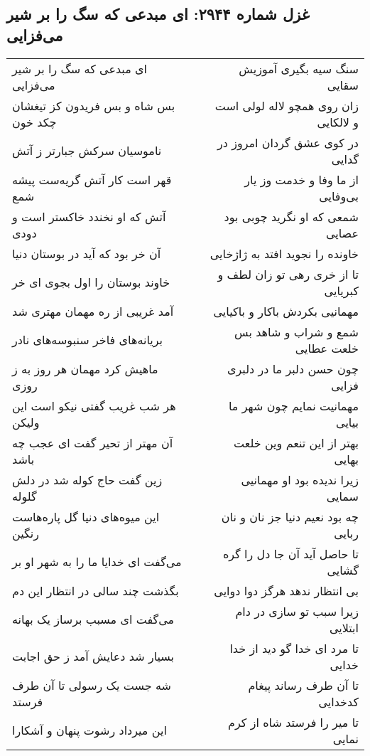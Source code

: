\begin{center}
\section*{غزل شماره ۲۹۴۴: ای مبدعی که سگ را بر شیر می‌فزایی}
\label{sec:2944}
\begin{longtable}{l p{0.5cm} r}
ای مبدعی که سگ را بر شیر می‌فزایی
&&
سنگ سیه بگیری آموزیش سقایی
\\
بس شاه و بس فریدون کز تیغشان چکد خون
&&
زان روی همچو لاله لولی است و لالکایی
\\
ناموسیان سرکش جبارتر ز آتش
&&
در کوی عشق گردان امروز در گدایی
\\
قهر است کار آتش گریه‌ست پیشه شمع
&&
از ما وفا و خدمت وز یار بی‌وفایی
\\
آتش که او نخندد خاکستر است و دودی
&&
شمعی که او نگرید چوبی بود عصایی
\\
آن خر بود که آید در بوستان دنیا
&&
خاونده را نجوید افتد به ژاژخایی
\\
خاوند بوستان را اول بجوی ای خر
&&
تا از خری رهی تو زان لطف و کبریایی
\\
آمد غریبی از ره مهمان مهتری شد
&&
مهمانیی بکردش باکار و باکیایی
\\
بریانه‌های فاخر سنبوسه‌های نادر
&&
شمع و شراب و شاهد بس خلعت عطایی
\\
ماهیش کرد مهمان هر روز به ز روزی
&&
چون حسن دلبر ما در دلبری فزایی
\\
هر شب غریب گفتی نیکو است این ولیکن
&&
مهمانیت نمایم چون شهر ما بیایی
\\
آن مهتر از تحیر گفت ای عجب چه باشد
&&
بهتر از این تنعم وین خلعت بهایی
\\
زین گفت حاج کوله شد در دلش گلوله
&&
زیرا ندیده بود او مهمانیی سمایی
\\
این میوه‌های دنیا گل پاره‌هاست رنگین
&&
چه بود نعیم دنیا جز نان و نان ربایی
\\
می‌گفت ای خدایا ما را به شهر او بر
&&
تا حاصل آید آن جا دل را گره گشایی
\\
بگذشت چند سالی در انتظار این دم
&&
بی انتظار ندهد هرگز دوا دوایی
\\
می‌گفت ای مسبب برساز یک بهانه
&&
زیرا سبب تو سازی در دام ابتلایی
\\
بسیار شد دعایش آمد ز حق اجابت
&&
تا مرد ای خدا گو دید از خدا خدایی
\\
شه جست یک رسولی تا آن طرف فرستد
&&
تا آن طرف رساند پیغام کدخدایی
\\
این میرداد رشوت پنهان و آشکارا
&&
تا میر را فرستد شاه از کرم نمایی
\\

\end{longtable}
\end{center}

